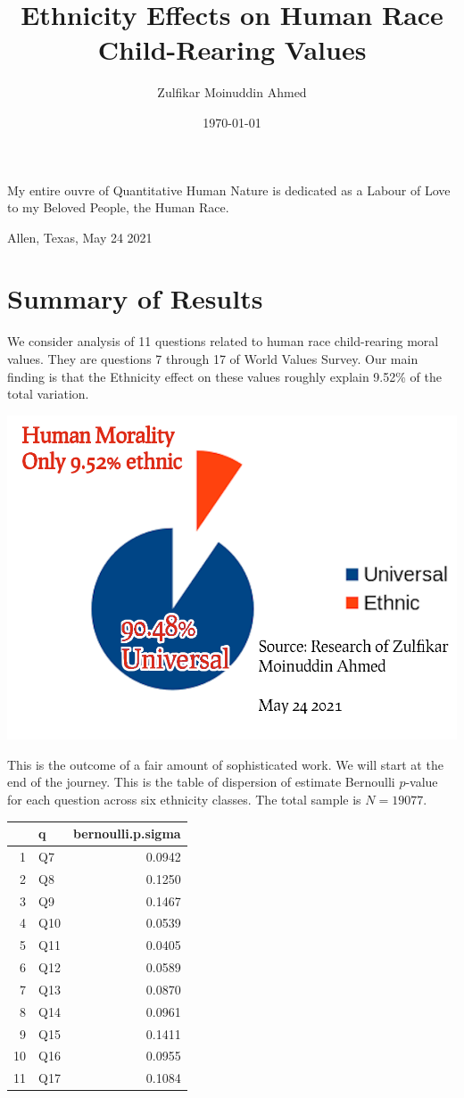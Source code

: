 \documentclass{amsart}
\title{Ethnicity Effects on Human Race Child-Rearing Values}
\author{Zulfikar Moinuddin Ahmed}
\date{\today}
\begin{document}
\maketitle
\epigraph{My entire ouvre of Quantitative Human Nature is dedicated as a Labour of Love to my Beloved People, the Human Race.}{Allen, Texas, May 24 2021}

\section{Summary of Results}

We consider analysis of 11 questions related to human race child-rearing moral values.  They are questions 7 through 17 of World Values Survey.  Our main finding is that the Ethnicity effect on these values roughly explain 9.52\% of the total variation.  

\includegraphics[angle=180,scale=-.3]{ethnic_slice.png}

This is the outcome of a fair amount of sophisticated work.  We will start at the end of the journey.  This is the table of dispersion of estimate Bernoulli $p$-value for each question across six ethnicity classes.  The total sample is $N=19077$.

\begin{table}[ht]
\centering
\begin{tabular}{rlr}
  \hline
 & q & bernoulli.p.sigma \\ 
  \hline
1 & Q7 & 0.0942 \\ 
  2 & Q8 & 0.1250 \\ 
  3 & Q9 & 0.1467 \\ 
  4 & Q10 & 0.0539 \\ 
  5 & Q11 & 0.0405 \\ 
  6 & Q12 & 0.0589 \\ 
  7 & Q13 & 0.0870 \\ 
  8 & Q14 & 0.0961 \\ 
  9 & Q15 & 0.1411 \\ 
  10 & Q16 & 0.0955 \\ 
  11 & Q17 & 0.1084 \\ 
   \hline
\end{tabular}
\end{table}
\end{document}
